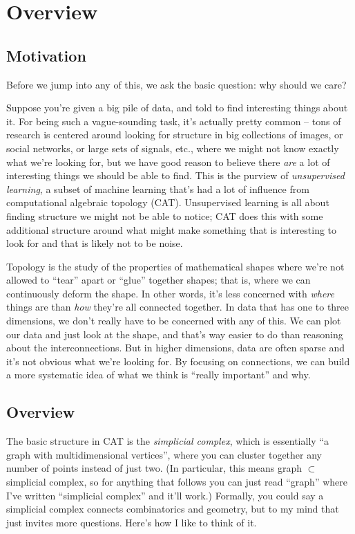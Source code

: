 \documentclass{lec}
\begin{document}
    \section{Overview}

    \subsection{Motivation}

    Before we jump into any of this, we ask the basic question: why should we care?

    Suppose you're given a big pile of data, and told to find interesting things about it. For being such a vague-sounding task, it's actually pretty common -- tons of research is centered around looking for structure in big collections of images, or social networks, or large sets of signals, etc., where we might not know exactly what we're looking for, but we have good reason to believe there \textit{are} a lot of interesting things we should be able to find. This is the purview of \textit{unsupervised learning}, a subset of machine learning that's had a lot of influence from computational algebraic topology (CAT). Unsupervised learning is all about finding structure we might not be able to notice; CAT does this with some additional structure around what might make something that is interesting to look for and that is likely not to be noise.

    Topology is the study of the properties of mathematical shapes where we're not allowed to ``tear'' apart or ``glue'' together shapes; that is, where we can continuously deform the shape. In other words, it's less concerned with \textit{where} things are than \textit{how} they're all connected together. In data that has one to three dimensions, we don't really have to be concerned with any of this. We can plot our data and just look at the shape, and that's way easier to do than reasoning about the interconnections. But in higher dimensions, data are often sparse and it's not obvious what we're looking for. By focusing on connections, we can build a more systematic idea of what we think is ``really important'' and why.

    \subsection{Overview}

    The basic structure in CAT is the \textit{simplicial complex}, which is essentially ``a graph with multidimensional vertices'', where you can cluster together any number of points instead of just two. (In particular, this means graph $\subset$ simplicial complex, so for anything that follows you can just read ``graph'' where I've written ``simplicial complex'' and it'll work.) Formally, you could say a simplicial complex connects combinatorics and geometry, but to my mind that just invites more questions. Here's how I like to think of it.
    
\end{document}
